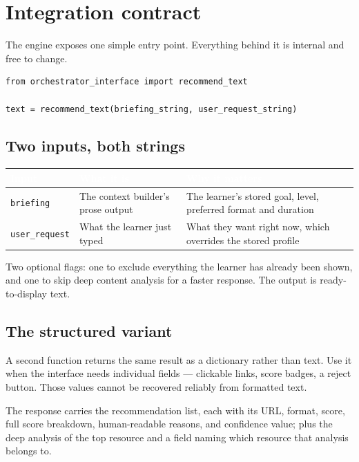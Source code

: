 \documentclass[11pt,a4paper]{article}
\newcommand{\code}[1]{\texttt{\small #1}}
\newcommand{\thead}[1]{\textcolor{white}{\bfseries\small #1}}
\newcommand{\headrow}{\rowcolor{navy}}
\begin{document}
\newpage
\section{Integration contract}

The engine exposes one simple entry point. Everything behind it is internal
and free to change.

\begin{lstlisting}
from orchestrator_interface import recommend_text

text = recommend_text(briefing_string, user_request_string)
\end{lstlisting}

\subsection{Two inputs, both strings}

\vspace{4pt}
\begin{tabularx}{\textwidth}{>{\raggedright\arraybackslash}p{3cm} >{\raggedright\arraybackslash}p{4.6cm} >{\raggedright\arraybackslash}X}
\headrow \thead{Input} & \thead{What it is} & \thead{Why it matters} \\
\midrule
\code{briefing} & The context builder's prose output & The learner's stored goal, level, preferred format and duration \\
\rowcolor{altshade} \code{user\_request} & What the learner just typed & What they want right now, which overrides the stored profile \\
\bottomrule
\end{tabularx}
\vspace{8pt}

Two optional flags: one to exclude everything the learner has already been
shown, and one to skip deep content analysis for a faster response. The output
is ready-to-display text.

\subsection{The structured variant}

A second function returns the same result as a dictionary rather than text.
Use it when the interface needs individual fields --- clickable links, score
badges, a reject button. Those values cannot be recovered reliably from
formatted text.

The response carries the recommendation list, each with its URL, format,
score, full score breakdown, human-readable reasons, and confidence value;
plus the deep analysis of the top resource and a field naming which resource
that analysis belongs to.
\end{document}
